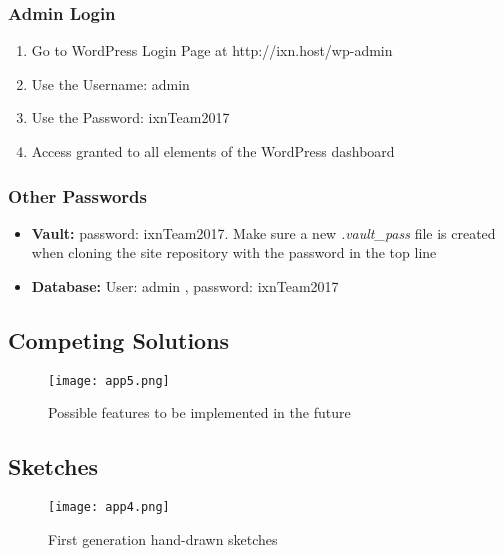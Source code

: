 \documentclass[fontsize=11pt]{extarticle}
\numberwithin{figure}{section} %
\numberwithin{table}{section}%
\begin{document}
\subsubsection{Admin Login}
\begin{enumerate}

  \item Go to WordPress Login Page at http://ixn.host/wp-admin
  \item Use the Username: admin
  \item Use the Password: ixnTeam2017
  \item Access granted to all elements of the WordPress dashboard

\end{enumerate}

\subsubsection{Other Passwords}
\begin{itemize}

  \item \textbf{Vault:} password: ixnTeam2017. Make sure a new \textit{.vault\_pass} file is created when cloning the site repository with the password in the top line
  \item \textbf{Database:} User: admin , password: ixnTeam2017

\end{itemize}

\begin{landscape}
\subsection{Competing Solutions}
  \begin{figure}[H]
      \centering
      \texttt{[image: app5.png]}
      \caption{Possible features to be implemented in the future}
 \end{figure}
 \end{landscape}

 \newpage


\begin{landscape}
\subsection{Sketches}
 \begin{figure}[H]
      \centering
      \texttt{[image: app4.png]}
      \caption{First generation hand-drawn sketches}
 \end{figure}
\end{landscape}
\end{document}
